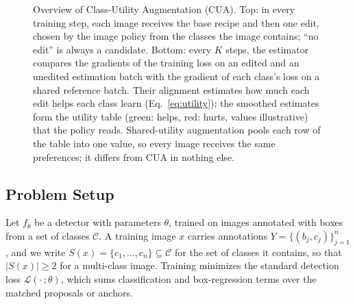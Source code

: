 \documentclass[conference]{IEEEtran}
\begin{document}
\begin{figure}[t]
\caption{Overview of Class-Utility Augmentation (CUA). Top: in every training step, each image receives the base recipe and then one edit, chosen by the image policy from the classes the image contains; ``no edit'' is always a candidate. Bottom: every $K$ steps, the estimator compares the gradients of the training loss on an edited and an unedited estimation batch with the gradient of each class's loss on a shared reference batch. Their alignment estimates how much each edit helps each class learn (Eq.~\eqref{eq:utility}); the smoothed estimates form the utility table (green: helps, red: hurts, values illustrative) that the policy reads. Shared-utility augmentation pools each row of the table into one value, so every image receives the same preferences; it differs from CUA in nothing else.}
\label{fig:framework}
\end{figure}

\subsection{Problem Setup}
\label{sec:method_setup}

Let $f_\theta$ be a detector with parameters $\theta$, trained on images annotated with boxes from a set of classes $\mathcal{C}$. A training image $x$ carries annotations $Y=\{(b_j,c_j)\}_{j=1}^{n}$, and we write $S(x)=\{c_1,\dots,c_n\}\subseteq\mathcal{C}$ for the set of classes it contains, so that $|S(x)|\geq 2$ for a multi-class image. Training minimizes the standard detection loss $\mathcal{L}(\cdot\,;\theta)$, which sums classification and box-regression terms over the matched proposals or anchors.
\end{document}
